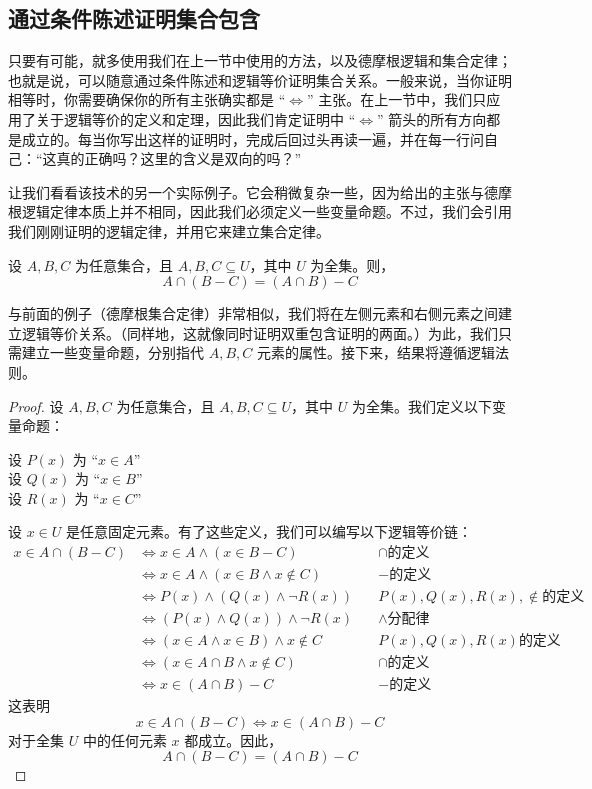 \subsection{通过条件陈述证明集合包含}

只要有可能，就多使用我们在上一节中使用的方法，以及德摩根逻辑和集合定律；也就是说，可以随意通过条件陈述和逻辑等价证明集合关系。一般来说，当你证明相等时，你需要确保你的所有主张确实都是 ``$\iff$'' 主张。在上一节中，我们只应用了关于逻辑等价的定义和定理，因此我们肯定证明中 ``$\iff$'' 箭头的所有方向都是成立的。每当你写出这样的证明时，完成后回过头再读一遍，并在每一行问自己：``这真的正确吗？这里的含义是双向的吗？''

让我们看看该技术的另一个实际例子。它会稍微复杂一些，因为给出的主张与德摩根逻辑定律本质上并不相同，因此我们必须定义一些变量命题。不过，我们会引用我们刚刚证明的逻辑定律，并用它来建立集合定律。

\begin{proposition}
    设 $A, B, C$ 为任意集合，且 $A, B, C \subseteq U$，其中 $U$ 为全集。则，
    \[A \cap (B - C) = (A \cap B) - C\]
\end{proposition}

与前面的例子（德摩根集合定律）非常相似，我们将在左侧元素和右侧元素之间建立逻辑等价关系。（同样地，这就像同时证明双重包含证明的两面。）为此，我们只需建立一些变量命题，分别指代 $A, B, C$ 元素的属性。接下来，结果将遵循逻辑法则。

\begin{proof}
    设 $A, B, C$ 为任意集合，且 $A, B, C \subseteq U$，其中 $U$ 为全集。我们定义以下变量命题：
    \begin{center}
        设 $P(x)$ 为 ``$x \in A$'' \\
        设 $Q(x)$ 为 ``$x \in B$'' \\
        设 $R(x)$ 为 ``$x \in C$'' \\
    \end{center}
    设 $x \in U$ 是任意固定元素。有了这些定义，我们可以编写以下逻辑等价链：
    \begin{align*}
        x \in A \cap (B - C) &\iff x \in A \land (x \in B - C) &\quad \cap \text{的定义} \\
        &\iff x \in A \land (x \in B \land x \notin C) &\quad - \text{的定义}\\
        &\iff P(x) \land (Q(x) \land \neg R(x)) &\quad P(x), Q(x), R(x), \notin \text{的定义} \\
        &\iff (P(x) \land Q(x)) \land \neg R(x) &\quad \land \text{分配律} \\
        &\iff (x \in A \land x \in B) \land x \notin C &\quad P(x), Q(x), R(x) \text{的定义}\\
        &\iff (x \in A \cap B \land x \notin C) &\quad \cap \text{的定义} \\
        &\iff x \in (A \cap B) - C &\quad - \text{的定义}
    \end{align*}
    这表明
    \[x \in A \cap (B - C) \iff x \in (A \cap B) - C\]
    对于全集 $U$ 中的任何元素 $x$ 都成立。因此，
    \[A \cap (B - C) = (A \cap B) - C\]
\end{proof}

